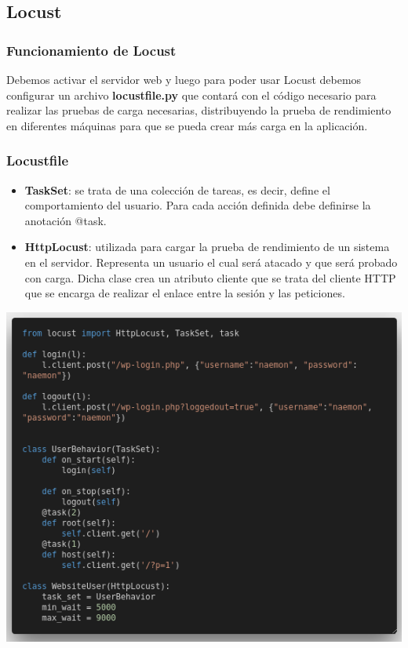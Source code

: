 \documentclass{beamer}
\theoremstyle{plain}
\theoremstyle{definition}
\theoremstyle{plain}
\theoremstyle{definition}
\theoremstyle{remark}
\theoremstyle{definition}
\begin{document}
\subsection{Locust}
\begin{frame}
	\frametitle{Funcionamiento de Locust}
	Debemos activar el servidor web y luego para poder usar Locust debemos configurar un archivo \textbf{locustfile.py} que contará con el código necesario para realizar las pruebas de carga necesarias, distribuyendo la prueba de rendimiento en diferentes máquinas para que se
	pueda crear más carga en la aplicación.
	
\end{frame}
\begin{frame}
	\frametitle{Locustfile}
	\begin{itemize}
		\item \textbf{TaskSet}: se trata de una colección de tareas, es decir, define el comportamiento del usuario. Para cada acción definida debe definirse la anotación @task.
		\item \textbf{HttpLocust}: utilizada para cargar la prueba de rendimiento de un sistema en el servidor. Representa un usuario el cual será atacado y que será probado con carga. Dicha clase crea un atributo cliente que se trata del cliente HTTP que se encarga de realizar el enlace entre la
		sesión y las peticiones.
	\end{itemize}
\end{frame}
\begin{frame}
		\centering
	\includegraphics[scale=0.3]{imagenes/locustfile.png}
\end{frame}
\end{document}
